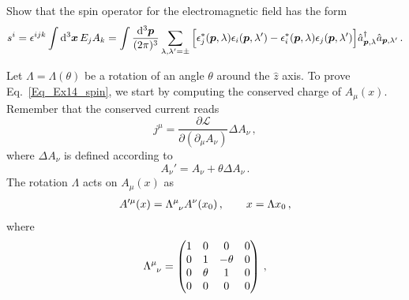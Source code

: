 \begin{ex} \label{ex_14} 
    Show that the spin operator for the electromagnetic field has the form
    \begin{equation}
        s^{i} = \epsilon^{ijk}\int {\rm d}^3 \boldsymbol{x} \, E_{j}A_{k} = \int \frac{{\rm d}^3 \boldsymbol{p}}{(2\pi)^{3}} \sum_{\lambda ,\lambda'=\pm}\Big[\epsilon^*_{j}(\boldsymbol{p},\lambda)\epsilon_{i}(\boldsymbol{p}, \lambda') - \epsilon^*_{i}(\boldsymbol{p},\lambda)\epsilon_{j}(\boldsymbol{p}, \lambda')\Big]\hat{a}^\dagger_{\boldsymbol{p},\lambda}\hat{a}_{\boldsymbol{p}, \lambda'} \, .
        \label{Eq_Ex14_spin}
    \end{equation}
\end{ex}


\begin{sol}
    Let $\Lambda = \Lambda(\theta)$ be a rotation of an angle $\theta$ around the $\hat{z}$ axis. To prove Eq.~\eqref{Eq_Ex14_spin}, we start by computing the conserved charge of $A_{\mu}(x)$. Remember that the conserved current reads
    \begin{equation}
    \label{jmu}
            j^{\mu} = \frac{\partial \mathcal{L}}{\partial(\partial_{\mu}A_{\nu})} \Delta A_{\nu} \,,
    \end{equation}
    where $\Delta A_\nu$ is defined according to
    \begin{equation}
            A_\nu' = A_\nu + \theta \Delta A_{\nu}\,.
    \end{equation}
    The rotation $\Lambda$ acts on $A_\mu(x)$ as 
    \begin{equation}
    \begin{split}
        A'^{\mu}(x) = \tensor{\Lambda}{^\mu_\nu} A^{\nu}(x_{0}) \,, 
        \qquad 
        x = \Lambda x_{0} \,,
        \end{split}
    \end{equation}
    where
    \begin{equation}
        \tensor{\Lambda}{^\mu_\nu} = \begin{pmatrix}
            1 & 0 & 0 & 0 \\
            0 & 1 & -\theta & 0 \\
            0 & \theta & 1 & 0 \\
            0 & 0 & 0 & 0 \\
        \end{pmatrix} \,,
    \end{equation}

\end{sol}
